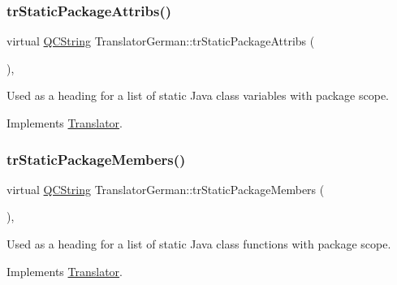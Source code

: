 \mbox{\label{class_translator_german_a7f75ddc91679055f82fe8f81010138ee}} 
\subsubsection{\texorpdfstring{trStaticPackageAttribs()}{trStaticPackageAttribs()}}
{\footnotesize\ttfamily virtual \mbox{\hyperlink{class_q_c_string}{Q\+C\+String}} Translator\+German\+::tr\+Static\+Package\+Attribs (\begin{DoxyParamCaption}{ }\end{DoxyParamCaption})\hspace{0.3cm}{\ttfamily [inline]}, {\ttfamily [virtual]}}

Used as a heading for a list of static Java class variables with package scope. 

Implements \mbox{\hyperlink{class_translator}{Translator}}.

\mbox{\label{class_translator_german_a83fb68f4a1ab813e66f830d29e670702}} 
\subsubsection{\texorpdfstring{trStaticPackageMembers()}{trStaticPackageMembers()}}
{\footnotesize\ttfamily virtual \mbox{\hyperlink{class_q_c_string}{Q\+C\+String}} Translator\+German\+::tr\+Static\+Package\+Members (\begin{DoxyParamCaption}{ }\end{DoxyParamCaption})\hspace{0.3cm}{\ttfamily [inline]}, {\ttfamily [virtual]}}

Used as a heading for a list of static Java class functions with package scope. 

Implements \mbox{\hyperlink{class_translator}{Translator}}.

\mbox{\label{class_translator_german_af2cd28365db67ee0377b5920d81e4a06}} 
